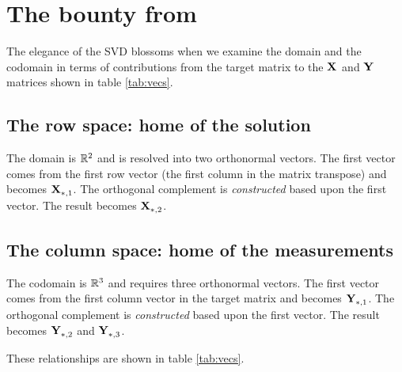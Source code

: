 \section[The bounty from the SVD]{The bounty from \svdl}
The elegance of the SVD blossoms when we examine the domain and the codomain in terms of contributions from the target matrix to the $\X{}$ and $\Y{}$ matrices shown in table \eqref{tab:vecs}.

\subsection{The row space: home of the solution}
The domain is $\real{2}$ and is resolved into two orthonormal vectors. The first vector comes from the first row vector (the first column in the matrix transpose) and becomes  $\textbf{X}^{\mathrm{}}_{*,1}$. The orthogonal complement is \textit{constructed} based upon the first vector. The result becomes $\textbf{X}^{\mathrm{}}_{*,2}$.

\subsection{The column space: home of the measurements}
The codomain is $\real{3}$ and requires three orthonormal vectors. The first vector comes from the first column vector in the target matrix and becomes  $\textbf{Y}^{\mathrm{}}_{*,1}$. The orthogonal complement is \textit{constructed} based upon the first vector. The result becomes $\textbf{Y}^{\mathrm{}}_{*,2}$ and $\textbf{Y}^{\mathrm{}}_{*,3}$.

These relationships are shown in table \eqref{tab:vecs}.

\begin{table}[h]
\begin{center}
\end{center}
\caption{Resolving the domain and codomain into complete orthonormal systems. In this pedagogical example we can see connections between the domain matrices $\X{}$ and $\Y{}$ and the inputs $\A{}$ and $\A{T}$. The \svdl \ has resolved the row and column spaces into complete domains $\real{2}$ and $\real{3}$ by resolving the orthogonal complements.}
\label{tab:vecs}
\end{table}

